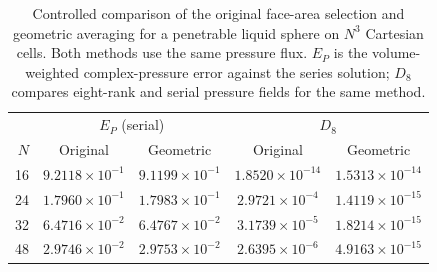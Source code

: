 \begin{table}[htbp]
\centering
\small
\setlength{\tabcolsep}{5pt}
\begin{tabular}{rcccc}
\toprule
& \multicolumn{2}{c}{$E_P$ (serial)} & \multicolumn{2}{c}{$D_8$} \\
$N$ & Original & Geometric & Original & Geometric \\
\midrule
16 & $9.2118\times10^{-1}$ & $9.1199\times10^{-1}$ & $1.8520\times10^{-14}$ & $1.5313\times10^{-14}$ \\
24 & $1.7960\times10^{-1}$ & $1.7983\times10^{-1}$ & $2.9721\times10^{-4}$ & $1.4119\times10^{-15}$ \\
32 & $6.4716\times10^{-2}$ & $6.4767\times10^{-2}$ & $3.1739\times10^{-5}$ & $1.8214\times10^{-15}$ \\
48 & $2.9746\times10^{-2}$ & $2.9753\times10^{-2}$ & $2.6395\times10^{-6}$ & $4.9163\times10^{-15}$ \\
\bottomrule
\end{tabular}
\caption{Controlled comparison of the original face-area selection and
geometric averaging for a penetrable liquid sphere on $N^3$ Cartesian cells.
Both methods use the same pressure flux. $E_P$ is the volume-weighted
complex-pressure error against the series solution; $D_8$ compares eight-rank
and serial pressure fields for the same method.}
\label{tab:geometricComparison}
\end{table}
